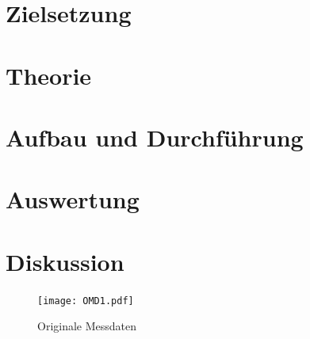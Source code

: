 

\setlength{\parindent}{0em}


%
%

\tableofcontents
\newpage

\section{Zielsetzung}



\section{Theorie}

\newpage

\section{Aufbau und Durchführung}



\section{Auswertung}


\section{Diskussion}


\begin{figure}
  \centering
  \texttt{[image: OMD1.pdf]}
  \caption{Originale Messdaten}
  \label{OMD1}
\end{figure}

